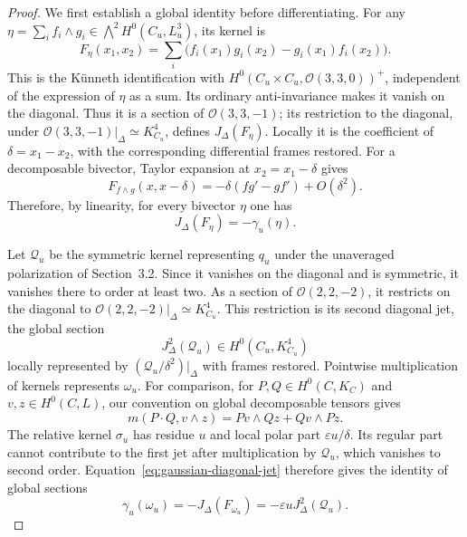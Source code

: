 \documentclass[10pt,a4paper]{amsart}
\newcommand{\OO}{\mathcal O}
\begin{document}
\begin{proof}
We first establish a global identity before differentiating. For any
$\eta=\sum_i f_i\wedge g_i\in\bigwedge^2H^0(C_u,L_u^3)$, its kernel is
\[
F_\eta(x_1,x_2)=\sum_i
\bigl(f_i(x_1)g_i(x_2)-g_i(x_1)f_i(x_2)\bigr).
\]
This is the K\"unneth identification with
$H^0(C_u\times C_u,\OO(3,3,0))^+$, independent of the expression of
$\eta$ as a sum. Its ordinary anti-invariance makes it vanish on
the diagonal. Thus it is a section of $\OO(3,3,-1)$; its restriction
to the diagonal, under
$\OO(3,3,-1)|_\Delta\simeq K_{C_u}^4$, defines
$J_\Delta(F_\eta)$. Locally it is the coefficient of
$\delta=x_1-x_2$, with the corresponding differential frames restored.
For a decomposable bivector, Taylor expansion at $x_2=x_1-\delta$ gives
\[
F_{f\wedge g}(x,x-\delta)
=-\delta(fg'-gf')+O(\delta^2).
\]
{Therefore, by linearity, for every bivector $\eta$ one has}
\begin{equation}
\label{eq:gaussian-diagonal-jet}
J_\Delta(F_\eta)=-\gamma_u(\eta).
\end{equation}

Let $\mathcal Q_u$ be the symmetric kernel representing $q_u$ under
the unaveraged polarization of Section~3.2. Since it vanishes on the
diagonal and is symmetric, it vanishes there to order at least two.
As a section of $\OO(2,2,-2)$, it restricts on the diagonal to
$\OO(2,2,-2)|_\Delta\simeq K_{C_u}^4$.
This restriction is its second diagonal jet, the global section
\[
J_\Delta^2(\mathcal Q_u)\in H^0(C_u,K_{C_u}^4)
\]
locally represented by $(\mathcal Q_u/\delta^2)|_\Delta$ with frames
restored. Pointwise multiplication of kernels represents $\omega_u$.
For comparison, for $P,Q\in H^0(C,K_C)$ and $v,z\in H^0(C,L)$,
our convention on global decomposable tensors gives
\begin{equation}
\label{eq:multiplication-formula}
m(P\cdot Q,v\wedge z)=Pv\wedge Qz+Qv\wedge Pz.
\end{equation}
The relative kernel $\sigma_u$ has residue $u$ and local polar part
$\varepsilon u/\delta$. Its regular part cannot contribute to the
first jet after multiplication by $\mathcal Q_u$, which vanishes to
second order. Equation~\eqref{eq:gaussian-diagonal-jet} therefore gives
the identity of
global sections
\begin{equation}
\label{eq:total-gaussian-identity}
\gamma_u(\omega_u)=
-J_\Delta(F_{\omega_u})=
-\varepsilon u J_\Delta^2(\mathcal Q_u).
\end{equation}


\end{proof}
\end{document}

